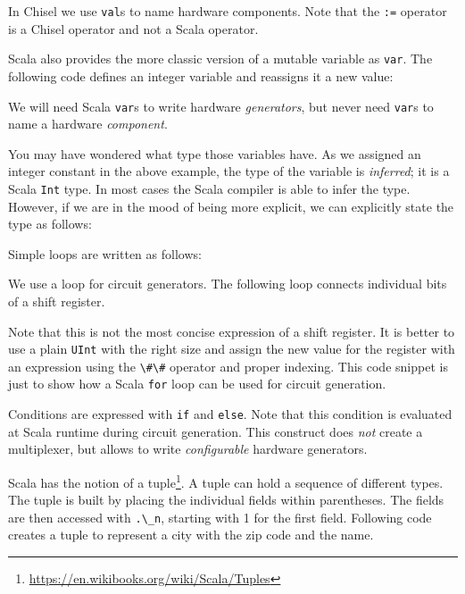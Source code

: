 \documentclass[%
    10pt,
    headinclude, footexclude,
    openright, %
    notitlepage,
    cleardoubleempty,
    headsepline,
    pointlessnumbers,
    bibtotoc, idxtotoc,
    ]{scrbook}
\newcommand{\code}[1]{{\lstinline[basicstyle=\small\ttfamily]{#1}}}
\newcommand{\myref}[2]{\href{#1}{#2}}
\renewcommand{\myref}[2]{{#2}{\footnote{\url{#1}}}}
\begin{document}

\noindent In Chisel we use \code{val}s to name hardware components. Note that the \code{:=}
operator is a Chisel operator and not a Scala operator.

Scala also provides the more classic version of a mutable variable as \code{var}. The following code defines
an integer variable and reassigns it a new value:


\noindent We will need Scala \code{var}s to write hardware \emph{generators}, but never need
\code{var}s to name a hardware \emph{component}.

You may have wondered what type those variables have. As we assigned an integer constant
in the above example, the type of the variable is \emph{inferred}; it is a Scala \code{Int} type.
In most cases the Scala compiler is able to infer the type. However, if we are in the mood of
being more explicit, we can explicitly state the type as follows:


Simple loops are written as follows:


We use a loop for circuit generators. The following loop connects individual bits
of a shift register.


\noindent Note that this is not the most concise expression of a shift register.
It is better to use a plain \code{UInt} with the right size and assign the new value for the
register with an expression using the \code{\#\#} operator
and proper indexing. This code snippet is just to show how a Scala \code{for} loop can be used
for circuit generation.

Conditions are expressed with \code{if} and \code{else}. Note that this condition
is evaluated at Scala runtime during circuit generation. This construct does \emph{not}
create a multiplexer, but allows to write \emph{configurable} hardware generators.


Scala has the notion of a \myref{https://en.wikibooks.org/wiki/Scala/Tuples}{tuple}.
A tuple can hold a sequence of different types. The tuple is built by placing the individual fields
within parentheses. The fields are then accessed with \code{.\_n}, starting with 1 for the first field.
Following code creates a tuple to represent a city with the zip code and the name.
\end{document}
